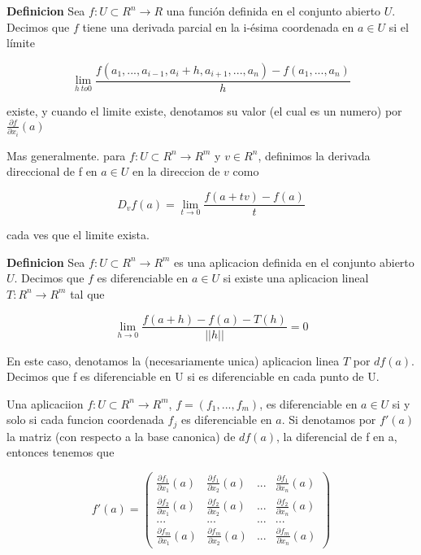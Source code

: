 \documentclass[letterpaper,12pt]{article}
\begin{document}
\textbf{Definicion} Sea $f : U \subset R^n \to R$ una función definida en el conjunto abierto $U$. 
Decimos que $f$ tiene una derivada parcial en la i-ésima coordenada en $a \in U$ si el límite

$$
\lim_{h \ to 0} \frac{f(a_1, ..., a_{i-1}, a_i+h, a_{i+1}, ..., a_n)- f(a_1, ..., a_n)}{h}
$$

existe, y cuando el limite existe, denotamos su valor (el cual es un numero) por $\frac{\partial f}{\partial x_i}(a)$

\hfill

Mas generalmente. para $f:U \subset R^n \to R^m$ y $v \in R^n$, definimos la derivada direccional de f
en $a \in U$ en la direccion de $v$ como

$$
D_v f(a) = \lim_{t \to 0} \frac{f(a+tv)-f(a)}{t}
$$

cada ves que el limite exista.

\hfill

\textbf{Definicion} Sea $f: U \subset R^n \to R^m$ es una aplicacion definida en el conjunto abierto $U$.
Decimos que $f$ es diferenciable en $a \in U$ si existe una aplicacion lineal $T: R^n \to R^m$
tal que

$$
\lim_{h \to 0} \frac{f(a+h) - f(a) - T(h)}{||h||} = 0
$$

En este caso, denotamos la (necesariamente unica) aplicacion linea $T$ por $df(a)$.
Decimos que f es diferenciable en U si es diferenciable en cada punto de U.

\hfill

Una aplicaciion $f: U \subset R^n \to R^m$, $f=(f_1, ..., f_m)$, es diferenciable en $a \in U$ si y solo si cada funcion coordenada $f_j$ es diferenciable en $a$. Si denotamos por $f'(a)$ 
la matriz (con respecto a la base canonica) de $df(a)$, la diferencial de f en a, entonces
tenemos que

\begin{equation}
f'(a) = \begin{pmatrix}
\frac{\partial f_1}{\partial x_1} (a) & \frac{\partial f_1}{\partial x_2} (a)  & ...  & \frac{\partial f_1}{\partial x_n} (a) \\
\frac{\partial f_2}{\partial x_1} (a) & \frac{\partial f_2}{\partial x_2} (a)  & ...  & \frac{\partial f_2}{\partial x_n} (a) \\
... & ...  & ... & ...  \\
\frac{\partial f_m}{\partial x_1} (a) & \frac{\partial f_m}{\partial x_2} (a)  & ...  & \frac{\partial f_m}{\partial x_n} (a)
\end{pmatrix}
\end{equation} 
\end{document}
